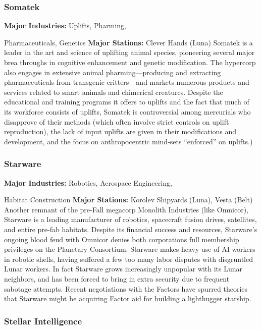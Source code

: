 \subsubsection{Somatek}

\textbf{Major Industries:} Uplifts, Pharming, 

Pharmaceuticals, Genetics
\textbf{Major Stations:} Clever Hands (Luna)
Somatek is a leader in the art and science of uplifting
animal species, pioneering several major brea
throughs in cognitive enhancement and genetic 
modification. The hypercorp also engages in extensive 
animal pharming—producing and extracting pharmaceuticals
from transgenic critters—and markets
numerous products and services related to smart animals
and chimerical creatures. Despite the educational
and training programs it offers to uplifts and the fact 
that much of its workforce consists of uplifts, Somatek 
is controversial among mercurials who disapprove of 
their methods (which often involve strict controls on 
uplift reproduction), the lack of input uplifts are given 
in their modifications and development, and the focus 
on anthropocentric mind-sets ``enforced'' on uplifts.)

\subsubsection{Starware}

\textbf{Major Industries:} Robotics, Aerospace Engineering, 

Habitat Construction
\textbf{Major Stations:} Korolev Shipyards (Luna), Vesta (Belt)
Another remnant of the pre-Fall megacorp Monolith 
Industries (like Omnicor), Starware is a leading manufacturer
of robotics, spacecraft fusion drives, satellites,
and entire pre-fab habitats. Despite its financial success
and resources, Starware's ongoing blood feud
with Omnicor denies both corporations full membership
privileges on the Planetary Consortium. Starware
makes heavy use of AI workers in robotic shells, 
having suffered a few too many labor disputes with 
disgruntled Lunar workers. In fact Starware grows increasingly
unpopular with its Lunar neighbors, and has
been forced to bring in extra security due to frequent 
sabotage attempts. Recent negotiations with the Factors
have spurred theories that Starware might be acquiring
Factor aid for building a lighthugger starship.

\subsubsection{Stellar Intelligence}

